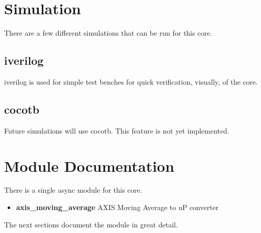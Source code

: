 \newpage

\section{Simulation}
\par
There are a few different simulations that can be run for this core.

\subsection{iverilog}
\par
iverilog is used for simple test benches for quick verification, visually, of the core.

\subsection{cocotb}
\par
Future simulations will use cocotb. This feature is not yet implemented.

\newpage

\section{Module Documentation} \label{Module Documentation}

\par
There is a single async module for this core.

\begin{itemize}
\item \textbf{axis\_moving\_average} AXIS Moving Average to uP converter\\
\end{itemize}
The next sections document the module in great detail.

